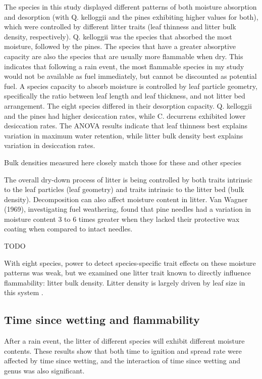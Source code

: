 \documentclass[fire,article,submit,moreauthors,pdftex]{Definitions/mdpi}
\begin{document}
The species in this study displayed different patterns of both moisture absorption and desorption (with Q. kelloggii and the pines exhibiting higher values for both), which were controlled by different litter traits (leaf thinness and litter bulk density, respectively). Q. kelloggii was the species that absorbed the most moisture, followed by the pines. The species that have a greater absorptive capacity are also the species that are usually more flammable when dry. This indicates that following a rain event, the most flammable species in my study would not be available as fuel immediately, but cannot be discounted as potential fuel. A species capacity to absorb moisture is controlled by leaf particle geometry, specifically the ratio between leaf length and leaf thickness, and not litter bed arrangement. The eight species differed in their desorption capacity. Q. kelloggii and the pines had higher desiccation rates, while C. decurrens exhibited lower desiccation rates. The ANOVA results indicate that leaf thinness best explains variation in maximum water retention, while litter bulk density best explains variation in desiccation rates.

Bulk densities measured here closely match those for these and other species \cite{van_Wagtendonk+Sydoriak+etal-1998,Stephens+Finney+etal-2004}

The overall dry-down process of litter is being controlled by both traits intrinsic to the leaf particles (leaf geometry) and traits intrinsic to the litter bed (bulk density). Decomposition can also affect moisture content in litter. Van Wagner (1969), investigating fuel weathering, found that pine needles had a variation in moisture content 3 to 6 times greater when they lacked their protective wax coating when compared to intact needles.


TODO

With eight species, power to detect species-specific trait effects on these moisture patterns was weak, but we examined one litter trait known to directly influence flammability: litter bulk density. Litter density is largely driven by leaf size in this system \cite{Magalhaes+Schwilk-2012}. 

\subsection{Time since wetting and flammability}

After a rain event, the litter of different species will exhibit different moisture contents. These results show that both time to ignition and spread rate were affected by time since wetting, and the interaction of time since wetting and genus was also significant.
\end{document}
